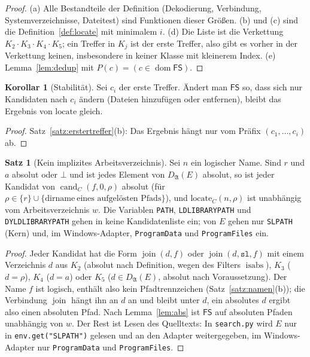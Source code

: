 \documentclass[a4paper,12pt,twoside]{report}
\DeclareRobustCommand{\_}{\ifmmode\mbox{\textunderscore}\else\textunderscore\allowbreak{}\fi}
\theoremstyle{definition}
\newtheorem{satz}{Satz}[chapter]
\newtheorem{korollar}{Korollar}[chapter]
\newcommand{\FS}{\mathsf{FS}}
\newcommand{\dom}{\operatorname{dom}}
\newcommand{\cand}{\operatorname{cand}}
\begin{document}
\begin{proof}
	(a) Alle Bestandteile der Definition (Dekodierung, Verbindung, Systemverzeichnisse, Dateitest) sind Funktionen dieser Größen. (b) und (c) sind die Definition~\ref{def:locate} mit minimalem $i$. (d) Die Liste ist die Verkettung $K_2\cdot K_3\cdot K_4\cdot K_5$; ein Treffer in $K_j$ ist der erste Treffer, also gibt es vorher in der Verkettung keinen, insbesondere in keiner Klasse mit kleinerem Index. (e) Lemma~\ref{lem:dedup} mit $P(c)=(c\in\dom\FS)$.
\end{proof}

\begin{korollar}[Stabilität]
	\label{kor:stabil}
	Sei $c_i$ der erste Treffer. Ändert man $\FS$ so, dass sich nur Kandidaten nach $c_i$ ändern (Dateien hinzufügen oder entfernen), bleibt das Ergebnis von $\mathrm{locate}$ gleich.
\end{korollar}

\begin{proof}
	Satz~\ref{satz:erstertreffer}(b): Das Ergebnis hängt nur vom Präfix $(c_1,\ldots,c_i)$ ab.
\end{proof}

\begin{satz}[Kein implizites Arbeitsverzeichnis]
	\label{satz:keincwd}
	Sei $n$ ein logischer Name. Sind $r$ und $a$ absolut oder $\bot$ und ist jedes Element von $D_{\mathfrak A}(E)$ absolut, so ist jeder Kandidat von $\cand_C(f,0,\rho)$ absolut (für $\rho\in\{r\}\cup\{\mathrm{dirname}\ \text{eines aufgelösten Pfads}\}$), und $\mathrm{locate}_C(n,\rho)$ ist unabhängig vom Arbeitsverzeichnis $w$. Die Variablen \texttt{PATH}, \texttt{LD\_LIBRARY\_PATH} und \texttt{DYLD\_LIBRARY\_PATH} gehen in keine Kandidatenliste ein; von $E$ gehen nur \texttt{SL\_PATH} (Kern) und, im Windows-Adapter, \texttt{ProgramData} und \texttt{ProgramFiles} ein.
\end{satz}

\begin{proof}
	Jeder Kandidat hat die Form $\operatorname{join}(d,f)$ oder $\operatorname{join}(d,\texttt{sl},f)$ mit einem Verzeichnis $d$ aus $K_2$ (absolut nach Definition, wegen des Filters $\operatorname{isabs}$), $K_3$ ($d=\rho$), $K_4$ ($d=a$) oder $K_5$ ($d\in D_{\mathfrak A}(E)$, absolut nach Voraussetzung). Der Name $f$ ist logisch, enthält also kein Pfadtrennzeichen (Satz~\ref{satz:namen}(b)); die Verbindung $\operatorname{join}$ hängt ihn an $d$ an und bleibt unter $d$, ein absolutes $d$ ergibt also einen absoluten Pfad. Nach Lemma~\ref{lem:abs} ist $\FS$ auf absoluten Pfaden unabhängig von $w$. Der Rest ist Lesen des Quelltexts: In \texttt{search.py} wird $E$ nur in \texttt{env.get("SL\_PATH")} gelesen und an den Adapter weitergegeben, im Windows-Adapter nur \texttt{ProgramData} und \texttt{ProgramFiles}.
\end{proof}
\end{document}
